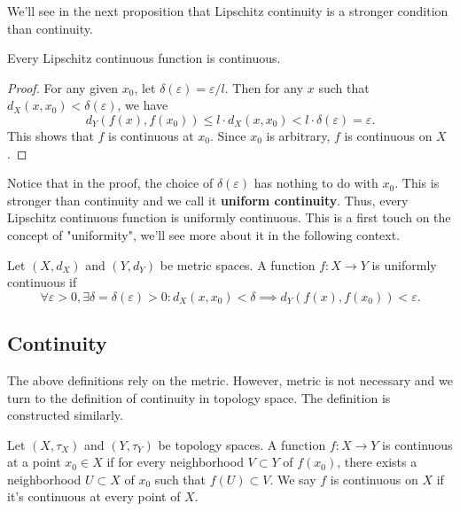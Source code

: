 We'll see in the next proposition that Lipschitz continuity is a stronger condition than continuity.
\begin{proposition}
    Every Lipschitz continuous function is continuous.
\end{proposition}
\begin{proof}
    For any given $x_0$, let $\delta(\varepsilon) = \varepsilon/l$. Then for any $x$ such that $d_X(x,x_0) < \delta(\varepsilon)$, we have
    $$d_Y(f(x),f(x_0)) \leq l \cdot d_X(x,x_0) < l \cdot \delta(\varepsilon) = \varepsilon.$$
    This shows that $f$ is continuous at $x_0$. Since $x_0$ is arbitrary, $f$ is continuous on $X$.
\end{proof}
\begin{remark}
    Notice that in the proof, the choice of $\delta(\varepsilon)$ has nothing to do with $x_0$. This is stronger than continuity and we call it \textbf{uniform continuity}. Thus, every Lipschitz continuous function is uniformly continuous.
    This is a first touch on the concept of "uniformity", we'll see more about it in the following context.
\end{remark}

\begin{definition}
    Let $(X,d_X)$ and $(Y,d_Y)$ be metric spaces. A function $f: X \to Y$ is uniformly continuous if 
        $$\forall \varepsilon > 0, \exists \delta = \delta(\varepsilon) > 0: d_X(x,x_0) < \delta \implies d_Y(f(x),f(x_0)) < \varepsilon.$$
\end{definition}

\subsection{Continuity}
The above definitions rely on the metric. However, metric is not necessary and we turn to the definition of continuity in topology space. The definition is constructed similarly.
\begin{definition}[Continuity]
    Let $(X,\tau_X)$ and $(Y,\tau_Y)$ be topology spaces. A function $f: X \to Y$ is continuous at a point $x_0 \in X$ if for every neighborhood $V \subset Y$ of $f(x_0)$,
    there exists a neighborhood $U \subset X$ of $x_0$ such that $f(U) \subset V$. We say $f$ is continuous on $X$ if it's continuous at every point of $X$.
\end{definition}

